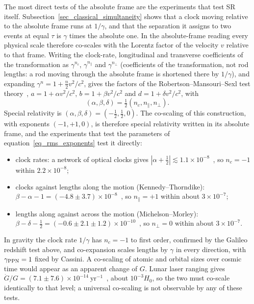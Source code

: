 \documentclass{iopjournal}
\begin{document}
The most direct tests of the absolute frame are the experiments that test SR itself. 
Subsection~\ref{sec_classical_simultaneity} shows that a clock moving relative to the absolute frame runs at $1/\gamma$, and that the separation it assigns to two events at equal $\tau$ is $\gamma$ times the absolute one. In the absolute-frame reading every physical scale therefore co-scales with the Lorentz factor of the velocity $v$ relative to that frame. Writing the clock-rate, longitudinal and transverse coefficients of the transformation as $\gamma^{n_c}$, $\gamma^{n_\parallel}$ and $\gamma^{n_\perp}$ (coefficients of the transformation, not rod lengths: a rod moving through the absolute frame is shortened there by $1/\gamma$), and expanding $\gamma^n=1+\tfrac{n}{2}v^2/c^2$, gives the factors of the Robertson--Mansouri--Sexl test theory~\cite{MansouriSexl1977}, $a=1+\alpha v^2/c^2$, $b=1+\beta v^2/c^2$ and $d=1+\delta v^2/c^2$, with
\begin{equation}\label{eq_rms_exponents}
    \left(\alpha,\beta,\delta\right)=\tfrac12\left(n_c,n_\parallel,n_\perp\right).
\end{equation}
Special relativity is $(\alpha,\beta,\delta)=(-\tfrac12,\tfrac12,0)$. The co-scaling of this construction, with exponents $(-1,+1,0)$, is therefore special relativity written in its absolute frame, and the experiments that test the parameters of equation~\eqref{eq_rms_exponents} test it directly:
\begin{itemize}
\item clock rates: a network of optical clocks gives $|\alpha+\tfrac12|\lesssim1.1\times10^{-8}$~\cite{Delva2017}, so $n_c=-1$ within $2.2\times10^{-8}$;
\item clocks against lengths along the motion (Kennedy--Thorndike): $\beta-\alpha-1=(-4.8\pm3.7)\times10^{-8}$~\cite{Tobar2010}, so $n_\parallel=+1$ within about $3\times10^{-7}$;
\item lengths along against across the motion (Michelson--Morley): $\beta-\delta-\tfrac12=(-0.6\pm2.1\pm1.2)\times10^{-10}$~\cite{Antonini2005,Schiller2006}, so $n_\perp=0$ within about $3\times10^{-7}$.
\end{itemize}
In gravity the clock rate $1/\gamma$ has $n_c=-1$ to first order, confirmed by the Galileo redshift test above, and co-expansion scales lengths by $\gamma$ in every direction, with $\gamma_{\rm PPN}=1$ fixed by Cassini. A co-scaling of atomic and orbital sizes over cosmic time would appear as an apparent change of $G$. Lunar laser ranging gives $\dot G/G=(7.1\pm7.6)\times10^{-14}~\mathrm{yr^{-1}}$~\cite{HofmannMuller2018}, about $10^{-3}H_0$, so the two must co-scale identically to that level; a universal co-scaling is not observable by any of these tests.
\end{document}
